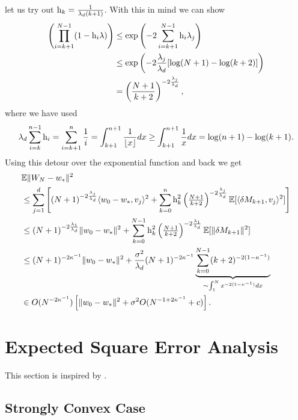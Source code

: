 let us try out \(\text{h}_k = \tfrac{1}{\lambda_d(k+1)}\). With this in
mind we can show
\begin{align*}
	\left(\prod_{i=k+1}^{N-1}(1-\text{h}_i\lambda)\right)
	&\le\exp\left(-2\sum_{i=k+1}^{N-1}\text{h}_i\lambda_j\right)\\
	&\le \exp\left(-2\frac{\lambda_j}{\lambda_d}[\log(N+1)-\log(k+2)]\right)\\
	&= \left(\frac{N+1}{k+2}\right)^{-2\frac{\lambda_j}{\lambda_d}},
\end{align*}
where we have used
\begin{align*}
	\lambda_d\sum_{i=k}^{n-1} \text{h}_i
	= \sum_{i=k+1}^n \frac{1}{i}
	= \int_{k+1}^{n+1} \frac{1}{\lfloor x\rfloor} dx
	\ge \int_{k+1}^{n+1} \frac{1}x dx
	= \log(n+1) - \log(k+1).
\end{align*}
Using this detour over the exponential function and back we get
\begin{align*}
	&\mathbb{E}\|W_N - w_*\|^2\\
	&\le \sum_{j=1}^d \Bigg[ (N+1)^{-2\frac{\lambda_j}{\lambda_d}}\langle w_0-w_*, v_j\rangle^2
	+ \sum_{k=0}^n \text{h}_k^2 \left(\tfrac{N+1}{k+2}\right)^{-2\frac{\lambda_j}{\lambda_d}}
	\mathbb{E}[\langle\delta M_{k+1},v_j\rangle^2]\Bigg]\\
	&\le (N+1)^{-2\frac{\lambda_1}{\lambda_d}}\|w_0-w_*\|^2
	+ \sum_{k=0}^{N-1} \text{h}_k^2 \left(\tfrac{N+1}{k+2}\right)^{-2\frac{\lambda_1}{\lambda_d}}
	\mathbb{E}[\|\delta M_{k+1}\|^2]\\
	&\le (N+1)^{-2\kappa^{-1}}\|w_0-w_*\|^2
	+ \frac{\sigma^2}{\lambda_d} (N+1)^{-2\kappa^{-1}}
	\underbrace{\sum_{k=0}^{N-1} (k+2)^{-2(1-\kappa^{-1})}}_{\sim \int_1^N x^{-2(1-\kappa^{-1})}dx}\\
	&\in O(N^{-2\kappa^{-1}})\left[\|w_0-w_*\|^2 + \sigma^2 O(N^{-1+2\kappa^{-1}} + c) \right].
\end{align*}

\section{Expected Square Error Analysis}

This section is inspired by \textcite{nemirovskiRobustStochasticApproximation2009}.

\subsection{Strongly Convex Case}

